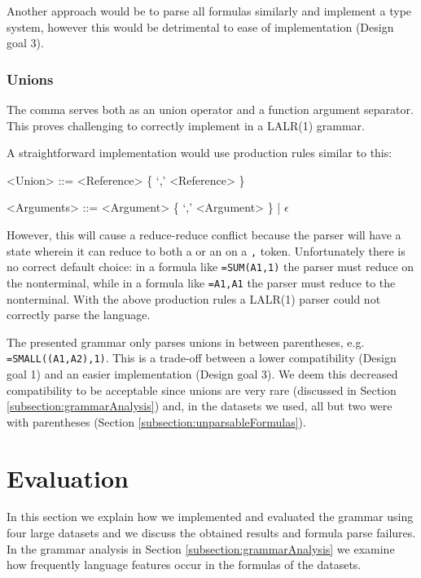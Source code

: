 \documentclass[times]{smrauth}
\begin{document}
Another approach would be to parse all formulas similarly and implement a type system, however this would be detrimental to ease of implementation (Design goal 3).

\subsubsection{\textbf{Unions}}
\label{subsec:desing:unions}

The comma serves both as an union operator and a function argument separator.
This proves challenging to correctly implement in a LALR(1) grammar.

A straightforward implementation would use production rules similar to this:
\begin{grammar}
	<Union> ::= <Reference> \{ `,' <Reference> \}

	<Arguments> ::= <Argument> \{ `,' <Argument> \} | $\epsilon$
\end{grammar}

However, this will cause a reduce-reduce conflict because the parser will have a state wherein it can reduce to both a  or an  on a \texttt{,} token.
Unfortunately there is no correct default choice: in a formula like \texttt{=SUM(A1,1)} the parser must reduce on the  nonterminal, while in a formula like \texttt{=A1,A1} the parser must reduce to the  nonterminal.
With the above production rules a LALR(1) parser could not correctly parse the language.

The presented grammar only parses unions in between parentheses, e.g. \texttt{=SMALL((A1,A2),1)}.
This is a trade-off between a lower compatibility (Design goal 1) and an easier implementation (Design goal 3).
We deem this decreased compatibility to be acceptable since unions are very rare (discussed in Section \ref{subsection:grammarAnalysis}) and, in the datasets we used, all but two were with parentheses (Section \ref{subsection:unparsableFormulas}).

\section{Evaluation}
\label{sec:evaluation}

In this section we explain how we implemented and evaluated the grammar using four large datasets and we discuss the obtained results and formula parse failures. In the grammar analysis in Section \ref{subsection:grammarAnalysis} we examine how frequently language features occur in the formulas of the datasets.
\end{document}

